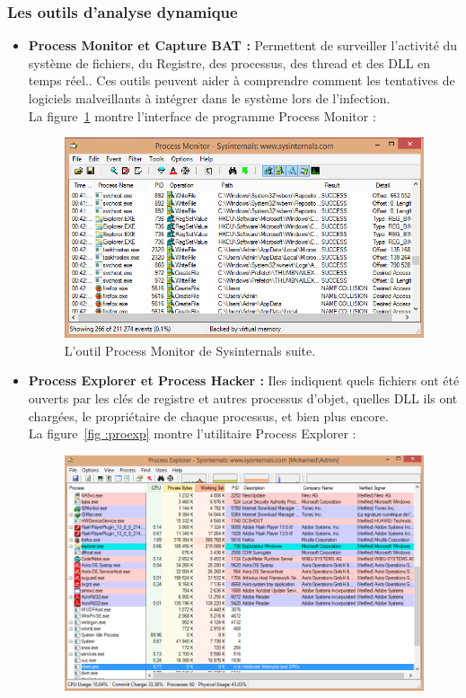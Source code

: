 \subsubsection{Les outils d'analyse dynamique}
\begin{itemize}
\item \textbf{Process Monitor et Capture BAT : }Permettent de surveiller l'activité du système de fichiers, du Registre, des processus, des thread et des DLL en temps réel.. Ces outils peuvent aider à comprendre comment les tentatives de logiciels malveillants à intégrer dans le système lors de l'infection.\\
La figure~\ref{fig :procmon} montre l'interface de programme Process Monitor :
\begin{figure}[H]
\begin{center}
\includegraphics[scale=0.7]{Figures/procmon.png}
\caption{L'outil Process Monitor de Sysinternals suite.}
\label{fig :procmon} 
\end{center}
\end{figure}
\item \textbf{ Process Explorer et Process Hacker : }Iles indiquent quels fichiers ont été ouverts par les clés de registre et autres processus d'objet, quelles DLL ils ont chargées, le propriétaire de chaque processus, et bien plus encore.  \\
La figure~\ref{fig :proexp} montre l'utilitaire Process Explorer :
\begin{figure}[H]
\begin{center}
\includegraphics[scale=0.6]{Figures/procexp.png}

\end{center}
\end{figure}
\end{itemize}
